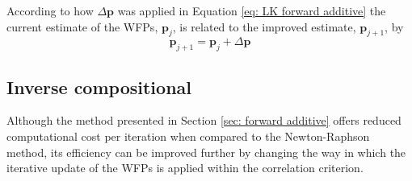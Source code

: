 \documentclass[12pt,oneside,openany,a4paper, %
english, %
masters-t, goldenblock]{usthesis}
\begin{document}
According to how $\Delta \bm{p}$ was applied in Equation \ref{eq: LK forward additive} the current estimate of the WFPs, $\bm{p}_j$, is related to the improved estimate, $\bm{p}_{j+1}$, by
\begin{equation}
  \bm{p}_{j+1} = \bm{p}_j + \Delta \bm{p}
\end{equation}





\subsection{Inverse compositional}
Although the method presented in Section \ref{sec: forward additive} offers reduced computational cost per iteration when compared to the Newton-Raphson method, its efficiency can be improved further by changing the way in which the iterative update of the WFPs is applied within the correlation criterion.
\end{document}
